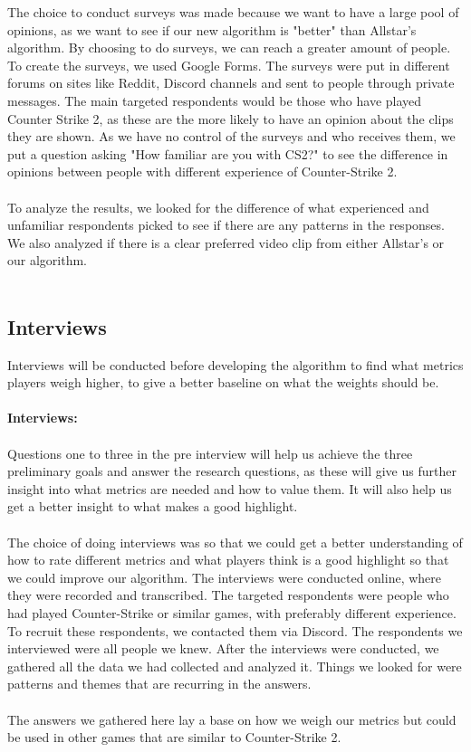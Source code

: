 The choice to conduct surveys was made because we want to have a large pool of opinions, as we want to see if our new algorithm is "better" than Allstar's algorithm. By choosing to do surveys, we can reach a greater amount of people. To create the surveys, we used Google Forms. The surveys were put in different forums on sites like Reddit, Discord channels and sent to people through private messages. The main targeted respondents would be those who have played Counter Strike 2, as these are the more likely to have an opinion about the clips they are shown. As we have no control of the surveys and who receives them, we put a question asking "How familiar are you with CS2?" to see the difference in opinions between people with different experience of Counter-Strike 2.\\\\
To analyze the results, we looked for the difference of what experienced and unfamiliar respondents picked to see if there are any patterns in the responses. We also analyzed if there is a clear preferred video clip from either Allstar's or our algorithm. 
\\\\

\subsection{Interviews}
\label{sec:interviews}
Interviews will be conducted before developing the algorithm to find what metrics players weigh higher, to give a better baseline on what the weights should be. \\ \\
\textbf {Interviews:}\\\\
Questions one to three in the pre interview will help us achieve the three preliminary goals and answer the research questions, as these will give us further insight into what metrics are needed and how to value them. It will also help us get a better insight to what makes a good highlight. \\\\
The choice of doing interviews was so that we could get a better understanding of how to rate different metrics and what players think is a good highlight so that we could improve our algorithm. The interviews were conducted online, where they were recorded and transcribed. The targeted respondents were people who had played Counter-Strike or similar games, with preferably different experience. To recruit these respondents, we contacted them via Discord. The respondents we interviewed were all people we knew. After the interviews were conducted, we gathered all the data we had collected and analyzed it. Things we looked for were patterns and themes that are recurring in the answers.\\\\
The answers we gathered here lay a base on how we weigh our metrics but could be used in other games that are similar to Counter-Strike 2.\\\\

